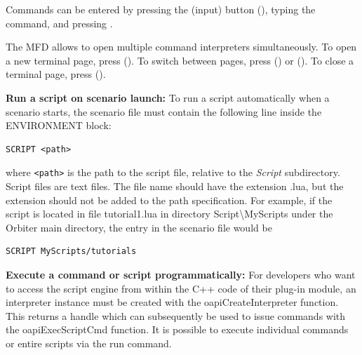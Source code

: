 \documentclass[Orbiter User Manual.tex]{subfiles}
\begin{document}
Commands can be entered by pressing the  (input) button
(), typing the command, and pressing \Enter.

The MFD allows to open multiple command interpreters simultaneously. To open a
new terminal page, press  (). To switch between pages,
press  () or  (\mfdkey{,}). To close a
terminal page, press  ().

\textbf{Run a script on scenario launch:}
To run a script automatically when a scenario starts, the scenario file must
contain the following line inside the ENVIRONMENT block:

\begin{lstlisting}[language=OSFS, escapechar=!]
SCRIPT <path>
\end{lstlisting}

where \texttt{<path>} is the path to the script file, relative to the
\emph{Script} subdirectory. Script files are text files. The file name should
have the extension .lua, but the extension should not be added to the path
specification. For example, if the script is located in file tutorial1.lua in
directory Script\textbackslash MyScripts under the Orbiter main directory, the
entry in the scenario file would be

\begin{lstlisting}[language=OSFS]
SCRIPT MyScripts/tutorials
\end{lstlisting}

\textbf{Execute a command or script programmatically:}
For developers who want to access the script engine from within the C++ code of
their plug-in module, an interpreter instance must be created with the
oapiCreateInterpreter function. This returns a handle which can subsequently be
used to issue commands with the oapiExecScriptCmd function. It is possible to
execute individual commands or entire scripts via the run command.
\end{document}
